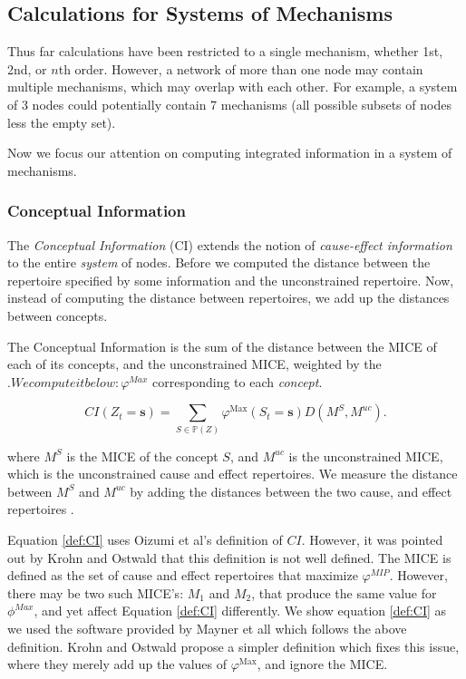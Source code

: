 \subsection{Calculations for Systems of Mechanisms}
\label{sec:systems}
Thus far calculations have been restricted to a single mechanism, whether 1st, 2nd, or $n$th order. However, a network of more than one node may contain multiple mechanisms, which may overlap with each other. For example, a system of 3 nodes could potentially contain 7 mechanisms (all possible subsets of nodes less the empty set).

Now we focus our attention on computing integrated information in a system of mechanisms. 

\subsubsection{Conceptual Information}
\label{sec:CI}
The \textit{Conceptual Information} (CI)\cite{oizumi2014phenomenology}  extends the notion of \textit{cause-effect information} to the entire \textit{system} of nodes. Before we computed the distance between the repertoire specified by some information and the unconstrained repertoire. Now, instead of computing the distance between repertoires, we add up the distances between concepts.

The Conceptual Information is the sum of the distance between the MICE of each of its concepts, and the unconstrained MICE, weighted by the $. We compute it below:
\varphi^{\textit{Max}}$ corresponding to each \textit{concept}.

\begin{equation}
\label{def:CI}
CI(Z_t = \mathbf{s}) = \sum \limits_{S \in \mathbb{P}(Z)} \varphi^{\text{Max}}(S_t=\mathbf{s}) D(M^S, M^{uc}).
\end{equation}

where $M^S$ is the MICE of the concept $S$, and $M^{uc}$ is the unconstrained MICE, which is the unconstrained cause and effect repertoires. We measure the distance between $M^S$ and $M^{uc}$ by adding the distances between the two cause, and effect repertoires \cite{oizumi2014phenomenology}.

\begin{remark}
	Equation \ref{def:CI} uses Oizumi et al's \cite{oizumi2014phenomenology} definition of $CI$. However, it was pointed out by Krohn and Ostwald \cite{krohn2016computing} that this definition is not well defined. The MICE is defined as the set of cause and effect repertoires that maximize $\varphi^{MIP}$. However, there may be two such MICE's: $M_1$ and $M_2$, that produce the same value for $\phi^{Max}$, and yet affect Equation \ref{def:CI} differently. We show equation \ref{def:CI} as we used the software provided by Mayner et all \cite{pyphi} which follows the above definition. Krohn and Ostwald propose a simpler definition which fixes this issue, where they merely add up the values of $\varphi^{\text{Max}}$, and ignore the MICE.
\end{remark}

